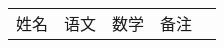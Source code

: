 \documentclass{ctexart}
\begin{document}
    
\begin{table}
    \begin{tabular}{l c c c r}
        姓名 & 语文 & 数学 & 备注 \\
       
    \end{tabular} 
\end{table}
\end{document}
